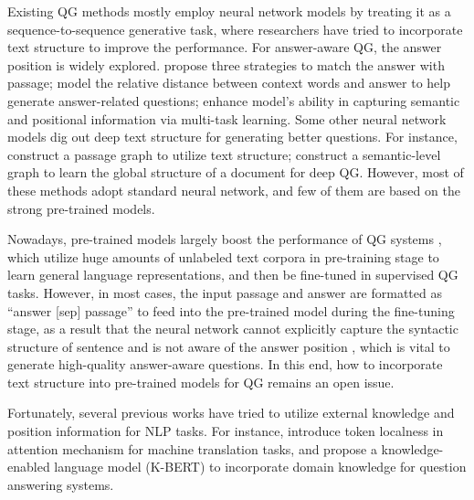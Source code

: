 \documentclass[11pt]{article}
\begin{document}
Existing QG methods mostly employ neural network models by treating it as a sequence-to-sequence generative task, where researchers have tried to incorporate text structure to improve the performance. For answer-aware QG, the answer position is widely explored. 
\citet{song-etal-2018-leveraging} propose three strategies to match the answer with passage; \citet{sun-etal-2018-answer} model the relative distance between context words and answer to help generate answer-related questions; \citet{Ma_Zhu_Zhou_Li_2020} enhance model's ability in capturing semantic and positional information via multi-task learning. Some other neural network models dig out deep text structure for generating better questions. For instance, \citet{Chen2020Reinforcement} construct a passage graph to utilize text structure;  \citet{pan-etal-2020-semantic} construct a semantic-level graph to learn the global structure of a document for deep QG. 
However, most of these methods adopt standard neural network, and few of them are based on the strong pre-trained models.


Nowadays, pre-trained models largely boost the performance of QG systems \citep{NEURIPS2019_c20bb2d9, bao2020unilmv2, qi-etal-2020-prophetnet, ijcai2020-553}, which utilize huge amounts of unlabeled text corpora in pre-training stage to learn general language representations, and then be fine-tuned in supervised QG tasks. However, in most cases, the input passage and answer are formatted as ``answer [sep] passage'' to feed into the pre-trained model during the fine-tuning stage, as a result that the neural network cannot explicitly capture the syntactic structure of sentence and is not aware of the answer position \citep{zhou2017neural}, which is vital to generate high-quality answer-aware questions. In this end, how to incorporate text structure into pre-trained models for QG remains an open issue.



Fortunately, several previous works have tried to utilize external knowledge and position information for NLP tasks. For instance, \citet{yang-etal-2018-modeling} introduce token localness in attention mechanism for machine translation tasks, and \citet{Liu_Zhou_Zhao_Wang_Ju_Deng_Wang_2020} propose a knowledge-enabled language model (K-BERT) to incorporate domain knowledge for question answering systems. 
\end{document}
